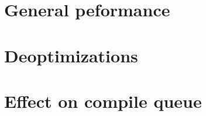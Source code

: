 \section{General peformance}
\label{s:perf_general}

\section{Deoptimizations}
\label{s:perf_deoptimizations}
\section{Effect on compile queue}
\label{s:perf_compilequeue}
